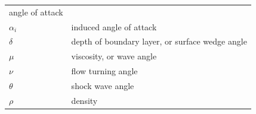\documentclass[
]{book}
\begin{document}
\begin{longtable}[]{@{}ll@{}}
\begin{minipage}[t]{0.72\columnwidth}
angle of attack\strut
\end{minipage}\tabularnewline
\begin{minipage}[t]{0.22\columnwidth}\raggedright
\(\alpha_i\)\strut
\end{minipage} & \begin{minipage}[t]{0.72\columnwidth}\raggedright
induced angle of attack\strut
\end{minipage}\tabularnewline
\begin{minipage}[t]{0.22\columnwidth}\raggedright
\(\delta\)\strut
\end{minipage} & \begin{minipage}[t]{0.72\columnwidth}\raggedright
depth of boundary layer, or surface wedge angle\strut
\end{minipage}\tabularnewline
\begin{minipage}[t]{0.22\columnwidth}\raggedright
\(\mu\)\strut
\end{minipage} & \begin{minipage}[t]{0.72\columnwidth}\raggedright
viscosity, or wave angle\strut
\end{minipage}\tabularnewline
\begin{minipage}[t]{0.22\columnwidth}\raggedright
\(\nu\)\strut
\end{minipage} & \begin{minipage}[t]{0.72\columnwidth}\raggedright
flow turning angle\strut
\end{minipage}\tabularnewline
\begin{minipage}[t]{0.22\columnwidth}\raggedright
\(\theta\)\strut
\end{minipage} & \begin{minipage}[t]{0.72\columnwidth}\raggedright
shock wave angle\strut
\end{minipage}\tabularnewline
\begin{minipage}[t]{0.22\columnwidth}\raggedright
\(\rho\)\strut
\end{minipage} & \begin{minipage}[t]{0.72\columnwidth}\raggedright
density\strut
\end{minipage}\tabularnewline
\bottomrule
\end{longtable}
\end{document}
